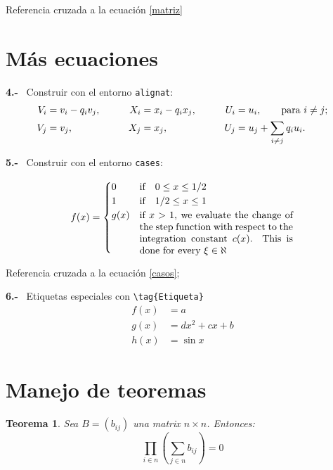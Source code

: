 \documentclass[a4paper,11pt]{article}
\begin{document}
  Referencia cruzada a la ecuación \eqref{matriz}

\section{Más ecuaciones}

\textbf{4.-} \ Construir con el entorno \texttt{alignat}:
\begin{alignat}{3}
V_i & =v_i - q_i v_j, & \qquad X_i & = x_i - q_i x_j,
 & \qquad U_i & = u_i,
 \qquad \text{para $i\ne j$;} \notag \\
V_j & = v_j, & \qquad X_j & = x_j,
  & \qquad U_j & = u_j + \sum_{i\ne j} q_i u_i.
\end{alignat}


\bigskip

\textbf{5.-} \ Construir con el entorno \texttt{cases}:

\begin{equation}
f(x)=\begin{cases}
0 & \text{if} \quad 0\leq x\leq 1/2 \\
1 & \text{if} \quad 1/2\leq x\leq 1 \\
g(x) & \parbox[t]{5.5cm}{if $x>1$, we evaluate
the change of the step function with 
respect to the integration constant $c(x)$. 
This is done for every $\xi\in\aleph$}
\end{cases}\label{casos}
\end{equation}

\medskip
Referencia cruzada a la ecuación \eqref{casos};

\bigskip

\textbf{6.-} \ Etiquetas especiales con \verb+\tag{Etiqueta}+
\begin{align}
f(x) & =a\tag{linear}\\
g(x) & =dx^{2}+cx+b\tag{quadratic}\\
h(x) & =\sin x\tag{trigonometric}
\end{align}


\newtheorem{teo}{Teorema}[section]
\newtheorem{lem}{Lema}


\section{Manejo de teoremas}

\begin{teo}\label{detmat} 
Sea $B=(b_{ij})$ una matrix $n\times n$. Entonces:
\begin{equation}
\prod_{i\in n}
\left(\sum_{j\in n}b_{ij}\right) = 0
\end{equation}
\end{teo}
\end{document}
